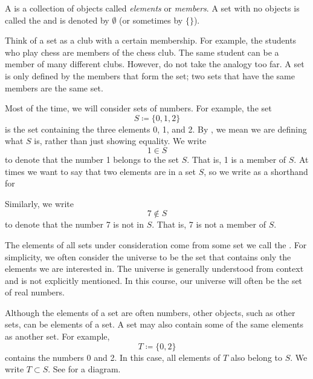 \begin{defn}
A \emph{} is a collection of objects called
\emph{elements} or \emph{members}.  A set with
no objects is called the \emph{} and is denoted by
$\emptyset$ (or sometimes by $\{ \}$).
\end{defn}

Think of a set as a club with a certain membership.  For
example, the students who play chess are members of the chess club.
The same student can be a member of many different clubs.
However,
do not take the analogy too far.  A set is only defined by the members
that form the set; two sets that have the same members are the same set.

Most of the time, we will consider sets
of numbers.  For example, the set
\begin{equation*}
S \coloneqq \{ 0, 1, 2 \}
\end{equation*}
is the set containing
the three elements 0, 1, and 2.
By \myquote{$\coloneqq$}, we mean we are defining what $S$ is, rather than
just showing equality.
We write
\begin{equation*}
1 \in S
\end{equation*}
to denote that the number 1 belongs to the set $S$.  That is, 1 is a member
of $S$.
At times we want to say that two elements are in a set $S$, so we 
write  as a shorthand for

Similarly, we write
\begin{equation*}
7 \notin S
\end{equation*}
to denote that the number 7 is not in $S$.  That is, 7 is not a member of
$S$.

The elements of all sets under consideration come from some set we call the
\emph{}.  For simplicity,
we often consider the universe to be the set that contains only the elements
we are interested in.
The universe is generally understood from context
and is not explicitly mentioned.  In this course, our universe will
often be the set of real numbers.

Although the elements of a set are often numbers,
other objects, such as other sets, can be elements of a set.
A set may also contain some of the same elements as another set.  For example,
\begin{equation*}
T \coloneqq \{ 0, 2 \}
\end{equation*}
contains the numbers 0 and 2.  In this case, all elements of $T$ also
belong to $S$.  We write $T \subset S$.
See  for a diagram.

